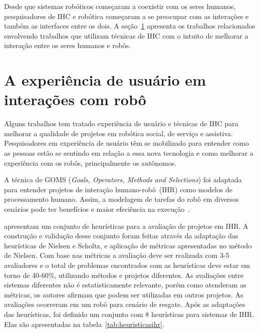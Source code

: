Desde que sistemas robóticos começaram a coexistir com os seres humanos, pesquisadores de IHC e robótica começaram a se preocupar com as interações e também as interfaces entre os dois. A seção~\ref{sec:ihrux} apresenta os trabalhos relacionados envolvendo trabalhos que utilizam técnicas de IHC com o intuito de melhorar a interação entre os seres humanos e robôs.

\section{A experiência de usuário em interações com robô}
\label{sec:ihrux}
Alguns trabalhos tem tratado experiência de usuário e técnicas de IHC para melhorar a qualidade de projetos em robótica social, de serviço e assistiva. Pesquisadores em experiência de usuário têm se mobilizado para entender como as pessoas estão se sentindo em relação a essa nova tecnologia e como melhorar a experiência com os robôs, principalmente os autônomos.

A técnica de GOMS (\emph{Goals, Operators, Methods and Selections}) foi adaptada para entender projetos de interação humano-robô~(IHR) como modelos de processamento humano. Assim, a modelagem de tarefas do robô em diversos cenários pode ter benefícios e maior efeciência na execução~\cite{drury:2007}.

 apresentam um conjunto de heurísticas para a avaliação de projetos em IHR. A construção e validação desse conjunto foram feitas através da adaptação das heurísticas de Nielsen e Scholtz, e aplicação de métricas apresentadas no método de Nielsen. Com base nas métricas a avaliação deve ser realizada com 3-5 avaliadores e o total de problemas encontrados com as heurísticas deve estar em torno de 40-60\%, utilizando métodos e projetos diferentes. As avaliações entre sistemas diferentes não é estatisticamente relevante, porém como atenderam as métricas, os autores afirmam que podem ser utilizadas em outros projetos. As avaliações ocorreram em um robô para cenário de resgate. Após as adaptações das heurísticas, foi definido um conjunto com 8 heurísticas para sistemas de IHR. Elas são apresentadas na tabela~\ref{tab:heuristicasihr}.

